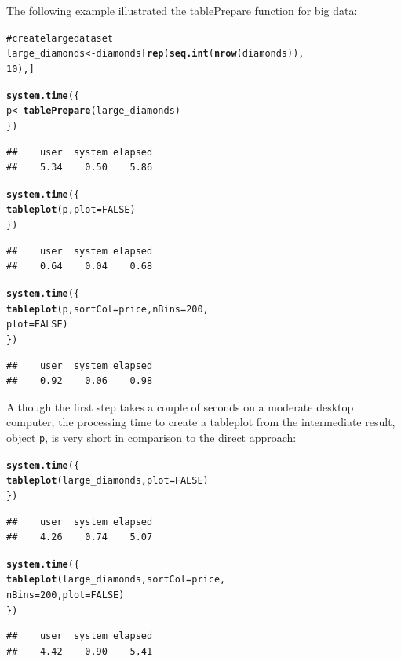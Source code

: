 \documentclass[11pt, fleqn, a4paper]{article}\usepackage{graphicx, color}
\makeatletter
\newcommand{\hlfunctioncall}[1]{\textcolor[rgb]{0.501960784313725,0,0.329411764705882}{\textbf{#1}}}%
\newcommand{\hlcomment}[1]{\textcolor[rgb]{0.180392156862745,0.6,0.341176470588235}{#1}}%
\newenvironment{kframe}{%
 \def\at@end@of@kframe{}%
 \ifinner\ifhmode%
  \def\at@end@of@kframe{\end{minipage}}%
  \begin{minipage}{\columnwidth}%
 \fi\fi%
 \def\FrameCommand##1{\hskip\@totalleftmargin \hskip-\fboxsep
 \colorbox{shadecolor}{##1}\hskip-\fboxsep
     \hskip-\linewidth \hskip-\@totalleftmargin \hskip\columnwidth}%
 \MakeFramed {\advance\hsize-\width
   \@totalleftmargin\z@ \linewidth\hsize
   \@setminipage}}%
 {\par\unskip\endMakeFramed%
 \at@end@of@kframe}
\newenvironment{knitrout}{}{} %
\makeatother
\begin{document}
The following example illustrated the tablePrepare function for big data:

\begin{knitrout}
\color{fgcolor}\begin{kframe}
\begin{alltt}
\hlcomment{# create large dataset}
large_diamonds <- diamonds[\hlfunctioncall{rep}(\hlfunctioncall{seq.int}(\hlfunctioncall{nrow}(diamonds)), 
    10), ]

\hlfunctioncall{system.time}(\{
    p <- \hlfunctioncall{tablePrepare}(large_diamonds)
\})
\end{alltt}
\begin{verbatim}
##    user  system elapsed 
##    5.34    0.50    5.86
\end{verbatim}
\begin{alltt}

\hlfunctioncall{system.time}(\{
    \hlfunctioncall{tableplot}(p, plot = FALSE)
\})
\end{alltt}
\begin{verbatim}
##    user  system elapsed 
##    0.64    0.04    0.68
\end{verbatim}
\begin{alltt}

\hlfunctioncall{system.time}(\{
    \hlfunctioncall{tableplot}(p, sortCol = price, nBins = 200, 
        plot = FALSE)
\})
\end{alltt}
\begin{verbatim}
##    user  system elapsed 
##    0.92    0.06    0.98
\end{verbatim}
\end{kframe}
\end{knitrout}


Although the first step takes a couple of seconds on a moderate desktop computer, the processing time to create a tableplot from the intermediate result, object {\tt p}, is very short in comparison to the direct approach:


\begin{knitrout}
\color{fgcolor}\begin{kframe}
\begin{alltt}
\hlfunctioncall{system.time}(\{
    \hlfunctioncall{tableplot}(large_diamonds, plot = FALSE)
\})
\end{alltt}
\begin{verbatim}
##    user  system elapsed 
##    4.26    0.74    5.07
\end{verbatim}
\begin{alltt}

\hlfunctioncall{system.time}(\{
    \hlfunctioncall{tableplot}(large_diamonds, sortCol = price, 
        nBins = 200, plot = FALSE)
\})
\end{alltt}
\begin{verbatim}
##    user  system elapsed 
##    4.42    0.90    5.41
\end{verbatim}
\end{kframe}
\end{knitrout}
\end{document}
